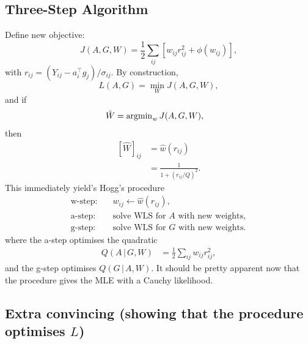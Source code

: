 \documentclass{article}
\begin{document}
\subsection{Three-Step Algorithm}

Define new objective:
\begin{equation}
    J(A,G,W) = \frac{1}{2}\sum_{ij} \left[ w_{ij} r_{ij}^2 + \phi(w_{ij}) \right],
\end{equation}
with $r_{ij} = (Y_{ij} - a_i^\top g_j)/\sigma_{ij}$.
By construction,
\begin{equation}
    L(A,G) = \min_W J(A,G,W),
\end{equation}
and if
\begin{align}
    \hat{W} &= {\rm argmin}_w \, J(A, G, W),
\end{align}
then
\begin{align}
    \left[ \hat{W} \right]_{ij} &= \hat{w} (r_{ij}) \\
    &= \frac{1}{1 + (r_{ij} / Q)^2}.
\end{align}
This immediately yield's Hogg's procedure
\begin{align*}
    \text{w-step:} \quad & w_{ij} \leftarrow \hat{w}(r_{ij}), \\
    \text{a-step:} \quad & \text{solve WLS for $A$ with new weights}, \\
    \text{g-step:} \quad & \text{solve WLS for $G$ with new weights}.
\end{align*}
where the a-step optimises the quadratic
\begin{align}
    Q(A \, | \, G, W) &= \frac{1}{2} \sum_{ij} w_{ij} r_{ij}^2,
\end{align}
and the g-step optimises $Q(G \, | \, A, W)$.
It should be pretty apparent now that the procedure gives the MLE with a Cauchy likelihood.

\subsection{Extra convincing (showing that the procedure optimises $L$)}
\end{document}
